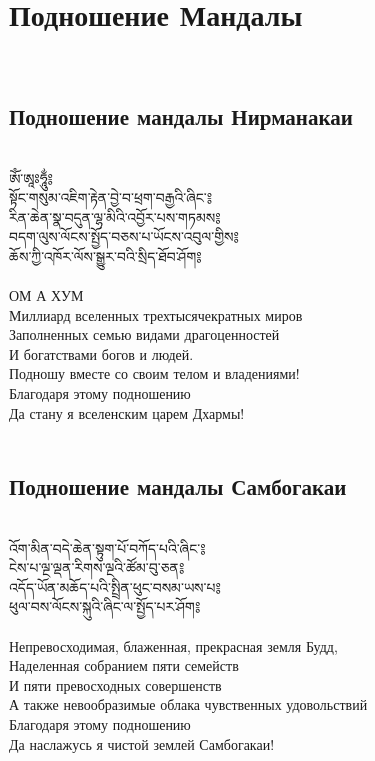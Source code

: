 \section{Подношение Мандалы}
\\
\subsection{Подношение мандалы Нирманакаи}
\\
\ti
ཨོཾ་ཨཱཿཧཱུྂ༔ \\
སྟོང་གསུམ་འཇིག་རྟེན་བྱེ་བ་ཕྲག་བརྒྱའི་ཞིང་༔\\
རིན་ཆེན་སྣ་བདུན་ལྷ་མིའི་འབྱོར་པས་གཏམས༔ \\
བདག་ལུས་ལོངས་སྤྱོད་བཅས་པ་ཡོངས་འབུལ་གྱིས༔ \\
ཆོས་ཀྱི་འཁོར་ལོས་སྒྱུར་བའི་སྲིད་ཐོབ་ཤོག༔ \\
\\
\ru
ОМ А ХУМ\\
Миллиард вселенных трехтысячекратных миров\\
Заполненных семью видами драгоценностей\\
И богатствами богов и людей.\\
Подношу вместе со своим телом и владениями!\\
Благодаря этому подношению\\
Да стану я вселенским царем Дхармы!\\
\\
\subsection{Подношение мандалы Самбогакаи}
\\
\ti
འོག་མིན་བདེ་ཆེན་སྟུག་པོ་བཀོད་པའི་ཞིང་༔ \\
ངེས་པ་ལྔ་ལྡན་རིགས་ལྔའི་ཚོམ་བུ་ཅན༔  \\
འདོད་ཡོན་མཆོད་པའི་སྤྲིན་ཕུང་བསམ་ཡས་པ༔ \\
ཕུལ་བས་ལོངས་སྐུའི་ཞིང་ལ་སྤྱོད་པར་ཤོག༔ \\
\\
\ru
Непревосходимая, блаженная, прекрасная земля Будд,\\
Наделенная собранием пяти семейств\\
И пяти превосходных совершенств\\
А также невообразимые облака чувственных удовольствий\\
Благодаря этому подношению\\
Да наслажусь я чистой землей Самбогакаи!\\
\\
